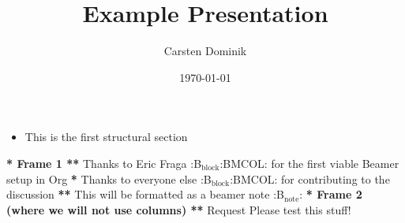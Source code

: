 \documentclass[presentation]{beamer}
\author{Carsten Dominik}
\date{\today}
\title{Example Presentation}
\begin{document}
\maketitle
\tableofcontents

\begin{itemize}
\item This is the first structural section
\end{itemize}

\textbf{* Frame 1
**} Thanks to Eric Fraga                                           :B$_{\text{block}}$:BMCOL:
for the first viable Beamer setup in Org
\textbf{*} Thanks to everyone else                                        :B$_{\text{block}}$:BMCOL:
for contributing to the discussion
\textbf{**} This will be formatted as a beamer note                              :B$_{\text{note}}$:
\textbf{* Frame 2 (where we will not use columns)
**} Request
Please test this stuff!
\end{document}
